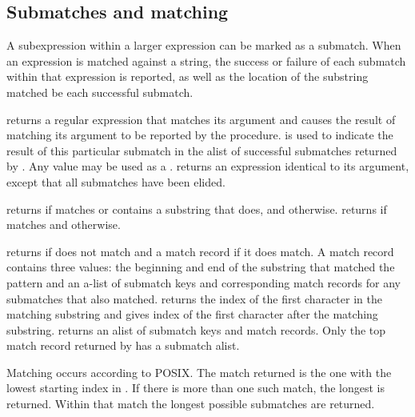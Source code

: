 \subsection{Submatches and matching}

A subexpression within a larger expression can be marked as a submatch.
When an expression is matched against a string, the success or failure
of each submatch within that expression is reported, as well as the
location of the substring matched be each successful submatch.

\begin{protos}
\end{protos}
\noindent
{} returns a regular expression that matches its argument and
 causes the result of matching its argument to be reported by the 
 procedure.
 is used to indicate the result of this particular submatch 
 in the alist of successful submatches returned by .
 Any value may be used as a .
 returns an expression identical to its
 argument, except that all submatches have been elided.

\begin{protos}
\end{protos}
\noindent
{} returns  if  matches  or
 contains a substring that does, and  otherwise.
 returns  if  matches
  and  otherwise.

 returns  if  does not match 
 and a match record if it does match.
A match record contains three values: the beginning and end of the substring
 that matched
 the pattern and an a-list of submatch keys and corresponding match records
 for any submatches that also matched.
 returns the index of
 the first character in the matching substring and  gives index
 of the first character after the matching substring.
 returns an alist of submatch keys and match records.
Only the top match record returned by  has a submatch alist.

Matching occurs according to POSIX.
The match returned is the one with the lowest starting index in .
If there is more than one such match, the longest is returned.
Within that match the longest possible submatches are returned.

